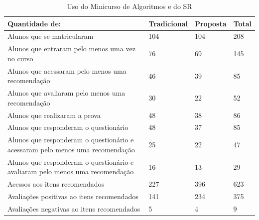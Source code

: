 \begin{table}[h]
\centering
\caption{Uso do Minicurso de Algoritmos e do SR}
\label{tab:uso-minicurso-sr}
\begin{tabular}{|p{7.5cm}|p{2.5cm}|p{2.5cm}|p{2.5cm}|}
\hline
\textbf{Quantidade de:}                                                                     & \textbf{Tradicional} & \textbf{Proposta}    & \textbf{Total}    \\
\hline
Alunos que se matricularam                                                                  & 104                  & 104                  & 208      \\
\hline
Alunos que entraram pelo menos uma vez no curso                                             & 76                   & 69                   & 145      \\
\hline
Alunos que acessaram pelo menos uma recomendação                                            & 46                   & 39                   & 85       \\
\hline
Alunos que avaliaram pelo menos uma recomendação                                            & 30                   & 22                   & 52       \\
\hline
Alunos que realizaram a prova                                                          & 48                   & 38                   & 86       \\
\hline
Alunos que responderam o questionário                                         & 48                   & 37                   & 85       \\
\hline
Alunos que responderam o questionário e acessaram pelo menos uma recomendação & 25                   & 22                   & 47       \\
\hline
Alunos que responderam o questionário e avaliaram pelo menos uma recomendação & 16                   & 13                   & 29       \\
\hline
Acessos aos itens recomendados                                                              & 227                  & 396                  & 623      \\
\hline
Avaliações positivas ao itens recomendados                                                  & 141                  & 234                  & 375      \\
\hline
Avaliações negativas ao itens recomendados                                                  & 5                    & 4                    & 9        \\
\hline
\end{tabular}
\end{table}

